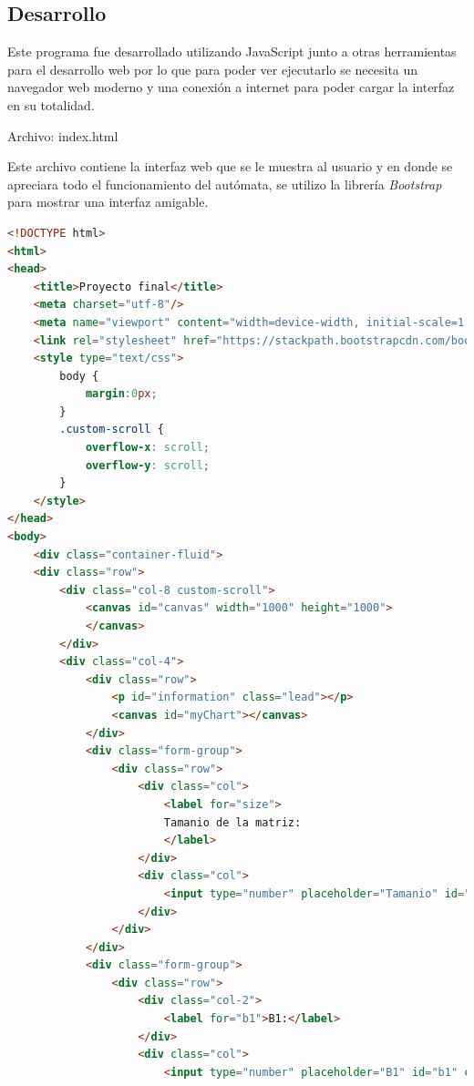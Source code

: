 \documentclass[12pt, titlepage]{article}
\begin{document}
\subsection{Desarrollo}
Este programa fue desarrollado utilizando JavaScript junto a otras herramientas para el desarrollo web por lo que para poder ver ejecutarlo se necesita un navegador web moderno y una conexión a internet para poder cargar la interfaz en su totalidad.

Archivo: index.html

Este archivo contiene la interfaz web que se le muestra al usuario y en donde se apreciara todo el funcionamiento del autómata, se utilizo la librería \emph{Bootstrap} para mostrar una interfaz amigable.

\begin{lstlisting}[language=html]
<!DOCTYPE html>
<html>
<head>
    <title>Proyecto final</title>
    <meta charset="utf-8"/>
    <meta name="viewport" content="width=device-width, initial-scale=1.0"/>
    <link rel="stylesheet" href="https://stackpath.bootstrapcdn.com/bootstrap/4.1.3/css/bootstrap.min.css" integrity="sha384-MCw98/SFnGE8fJT3GXwEOngsV7Zt27NXFoaoApmYm81iuXoPkFOJwJ8ERdknLPMO" crossorigin="anonymous">
    <style type="text/css">
        body {
            margin:0px;
        }
        .custom-scroll {
            overflow-x: scroll;
            overflow-y: scroll;
        }
    </style>
</head>
<body>
    <div class="container-fluid">
    <div class="row">
        <div class="col-8 custom-scroll">
            <canvas id="canvas" width="1000" height="1000">
            </canvas>
        </div>
        <div class="col-4">
            <div class="row">
                <p id="information" class="lead"></p>
                <canvas id="myChart"></canvas>
            </div>
            <div class="form-group">
                <div class="row">
                    <div class="col">
                        <label for="size">
                        Tamanio de la matriz:
                        </label>
                    </div>
                    <div class="col">
                        <input type="number" placeholder="Tamanio" id="size" class="form-control" value="100"/>
                    </div>
                </div>
            </div>
            <div class="form-group">
                <div class="row">
                    <div class="col-2">
                        <label for="b1">B1:</label>
                    </div>
                    <div class="col">
                        <input type="number" placeholder="B1" id="b1" class="form-control" value="2"/>

\end{lstlisting}
\end{document}
